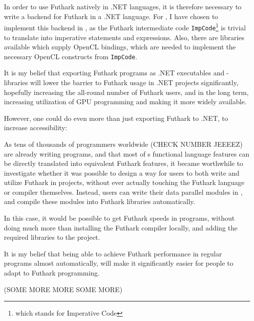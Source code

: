 In order to use Futhark natively in .NET languages, it is therefore
necessary to write a backend for Futhark in a .NET language.
For \fshark{}, I have chosen to implement this backend in \csharp{}, as the Futhark intermediate
code \texttt{ImpCode}\footnote{which stands for Imperative Code} is trivial to
translate into imperative \csharp{} statements and expressions.
Also, there are \csharp{} libraries available which supply OpenCL bindings, which are
needed to implement the necessary OpenCL constructs from \texttt{ImpCode}.

It is my belief that exporting Futhark programs as .NET executables and
-libraries will lower the barrier to Futhark usage in .NET projects
significantly, hopefully increasing the all-round number of Futhark users, and
in the long term, increasing utilization of GPU programming and making it more
widely available.

However, one could do even more than just exporting Futhark to .NET, to increase
accessibility:

As tens of thousands of programmers worldwide (CHECK NUMBER JEEEEZ) are already
writing \fsharp{} programs, and that most of \fsharp{}s functional language features can be
directly translated into equivalent Futhark features, it became worthwhile to
investigate whether it was possible to design a way for users to both write and
utilize Futhark in \fsharp{} projects, without ever actually touching the
Futhark language or compiler themselves.
Instead, users can write their data parallel \fsharp{} modules in \fshark{}, and compile these
modules into Futhark libraries automatically.

In this case, it would be possible to get Futhark speeds in \fsharp{} programs,
without doing much more than installing the Futhark compiler locally, and adding
the required \fshark{} libraries to the \fsharp{} project.

It is my belief that being able to achieve Futhark performance in regular \fsharp{}
programs almost automatically, will make it significantly easier for people to
adapt to Futhark programming.

(SOME MORE MORE SOME MORE)

\clearpage
